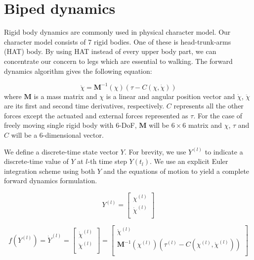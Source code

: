 \documentclass[a4paper,10pt]{article}
\begin{document}
\section{Biped dynamics}

Rigid body dynamics are commonly used in physical character model.
Our character model consists of 7 rigid bodies. One of these is
head-trunk-arms (HAT) body. By using HAT instead of every upper body
part, we can concentrate our concern to legs which are essential to
walking. The forward dynamics algorithm gives the following equation:


\begin{equation}
\ddot\chi =\mathbf{M}^{-1}(\chi) ( \tau - C(\chi,\dot\chi) )
\end{equation}
where $\mathbf{M}$ is a mass matrix and $\chi$ is a linear and angular position
vector and $\dot\chi$, $\ddot\chi$ are its first and second time derivatives,
respectively. $C$ represents all the other forces except the actuated and
external forces represented as $\tau$. For the case of freely moving single
rigid body with 6-DoF, $\mathbf{M}$ will be $6\times 6$ matrix and $\chi$,
$\tau$ and $C$ will be a 6-dimensional vector.

We define a discrete-time state vector $Y$. For brevity, we use $Y^{(l)}$
to indicate a discrete-time value of $Y$ at $l$-th time step $Y(t_l)$.
We use an explicit Euler integration
scheme using both $Y$ and the equations of motion to yield a complete
forward dynamics formulation.


\begin{equation}
Y^{(l)} =
\left[ {\begin{array}{cc}
 \chi^{(l)}   \\
 \dot\chi^{(l)}   \\
 \end{array} } \right]
\end{equation}


\begin{equation}
f(Y^{(l)})=\dot{Y}^{(l)}
=
\left[ {\begin{array}{cc}
 \dot\chi^{(l)}   \\
 \ddot\chi^{(l)}   \\
 \end{array} } \right]
 =
\left[ {\begin{array}{cc}
 \dot\chi^{(l)}   \\
 \mathbf{M}^{-1}(\chi^{(l)}) ( \tau^{(l)} - C(\chi^{(l)},\dot\chi^{(l)}) )   \\
 \end{array} } \right]
\end{equation}
\end{document}
